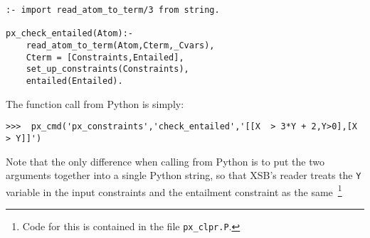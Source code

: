 \begin{example}
{\small
\begin{verbatim}
:- import read_atom_to_term/3 from string.

px_check_entailed(Atom):-
    read_atom_to_term(Atom,Cterm,_Cvars),
    Cterm = [Constraints,Entailed],
    set_up_constraints(Constraints),
    entailed(Entailed).
\end{verbatim}
}

The function call from Python is simply:

\begin{verbatim}
>>>  px_cmd('px_constraints','check_entailed','[[X  > 3*Y + 2,Y>0],[X > Y]]')
\end{verbatim}
\noindent
Note that the only difference when calling from Python is to put the
two arguments together into a single Python string, so that XSB's
reader treats the {\tt Y} variable in the input constraints and the
entailment constraint as the same~\footnote{Code for this is contained
  in the file {\tt px\_clpr.P}.}
\end{example}

